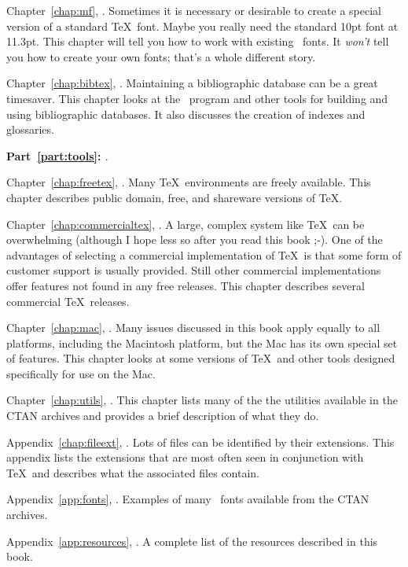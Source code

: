 Chapter~\ref{chap:mf}, {\it {}}.  Sometimes it is necessary or
desirable to create a special version of a standard \TeX\ font.  Maybe you
really need the standard 10pt font at 11.3pt.  This chapter will tell you how
to work with existing \MF\ fonts.  It {\em won't} tell you how to create your
own fonts; that's a whole different story.

Chapter~\ref{chap:bibtex}, {\it {}}.  Maintaining a
bibliographic database can be a great timesaver.  This chapter looks at the
\BibTeX\ program and other tools for building and using bibliographic
databases.  It also discusses the creation of indexes and glossaries.

\textbf{Part~\ref{part:tools}: {\it {}}}.

Chapter~\ref{chap:freetex}, {\it {}}.  Many \TeX\
environments are freely available.  This chapter describes public domain,
free, and shareware versions of \TeX.

\newpage
Chapter~\ref{chap:commercialtex}, {\it {}}.  A
large, complex system like \TeX\ can be overwhelming (although I hope less so
after you read this book ;-).  One of the advantages of selecting a commercial
implementation of \TeX\ is that some form of customer support is usually
provided.  Still other commercial implementations offer features not found in
any free releases.  This chapter describes several commercial \TeX\ releases.

Chapter~\ref{chap:mac}, {\it {}}.  Many issues
discussed in this book apply equally to all platforms, including the Macintosh
platform, but the Mac has its own special set of features.  This chapter looks
at some versions of \TeX\ and other tools designed specifically for use on the
Mac.

Chapter~\ref{chap:utils}, {\it {}}.  This chapter lists many
of the the utilities available in the CTAN archives and provides a brief
description of what they do.

Appendix~\ref{chap:fileext}, {\it {}}.  Lots of files can
be identified by their extensions.  This appendix lists the extensions that
are most often seen in conjunction with \TeX\ and describes what the
associated files contain.

Appendix~\ref{app:fonts}, \textit{}.  Examples of many
\MF\ fonts available from the CTAN archives.

Appendix~\ref{app:resources}, \textit{}.  A complete
list of the resources described in this book.  

